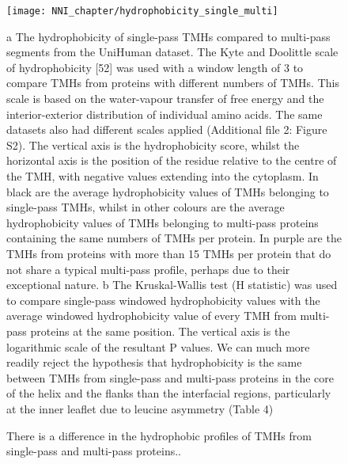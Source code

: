\begin{figure}[!ht]
\centering
\texttt{[image: NNI\_chapter/hydrophobicity\_single\_multi]}
\caption{There is a difference in the hydrophobic profiles of TMHs from single-pass and multi-pass proteins..}
\medskip
\justify
\small
 a The hydrophobicity of single-pass TMHs compared to multi-pass segments from the UniHuman dataset. The Kyte and Doolittle scale of hydrophobicity [52] was used with a window length of 3 to compare TMHs from proteins with different numbers of TMHs. This scale is based on the water-vapour transfer of free energy and the interior-exterior distribution of individual amino acids. The same datasets also had different scales applied (Additional file 2: Figure S2). The vertical axis is the hydrophobicity score, whilst the horizontal axis is the position of the residue relative to the centre of the TMH, with negative values extending into the cytoplasm. In black are the average hydrophobicity values of TMHs belonging to single-pass TMHs, whilst in other colours are the average hydrophobicity values of TMHs belonging to multi-pass proteins containing the same numbers of TMHs per protein. In purple are the TMHs from proteins with more than 15 TMHs per protein that do not share a typical multi-pass profile, perhaps due to their exceptional nature. b The Kruskal-Wallis test (H statistic) was used to compare single-pass windowed hydrophobicity values with the average windowed hydrophobicity value of every TMH from multi-pass proteins at the same position. The vertical axis is the logarithmic scale of the resultant P values. We can much more readily reject the hypothesis that hydrophobicity is the same between TMHs from single-pass and multi-pass proteins in the core of the helix and the flanks than the interfacial regions, particularly at the inner leaflet due to leucine asymmetry (Table 4)
\label{fig:hydrophobicity_single_multi}
\end{figure}


